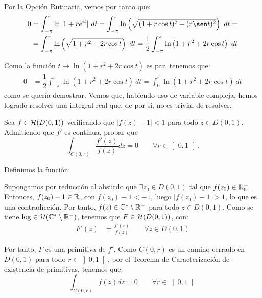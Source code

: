 \begin{ejercicio}
    Por la Opción Rutinaria, vemos por tanto que:
    \begin{align*}
        0&= \int_{-\pi}^{\pi} \ln|1+re^{it}|\ dt
        = \int_{-\pi}^{\pi} \ln\left(\sqrt{(1+r\cos t)^2+(r\sen t)^2}\right)\ dt
        =\\&= \int_{-\pi}^{\pi} \ln\left(\sqrt{1+r^2+2r\cos t}\right)\ dt
        = \dfrac{1}{2}\int_{-\pi}^{\pi} \ln\left(1+r^2+2r\cos t\right)\ dt
    \end{align*}

    Como la función $t\mapsto \ln\left(1+r^2+2r\cos t\right)$ es par, tenemos que:
    \begin{align*}
        0&= \dfrac{1}{2}\int_{-\pi}^{\pi} \ln\left(1+r^2+2r\cos t\right)\ dt
        = \int_{0}^{\pi} \ln\left(1+r^2+2r\cos t\right)\ dt
    \end{align*}
    como se quería demostrar. Vemos que, habiendo uso de variable compleja, hemos logrado resolver una integral real que, de por si, no es trivial de resolver.
\end{ejercicio}

\begin{ejercicio}
    Sea $f \in \mathcal{H}(D(0,1))$ verificando que $|f(z)-1| < 1$ para todo $z \in D(0,1)$. Admitiendo que $f'$ es continua, probar que
    \[
        \int_{C(0,r)} \frac{f'(z)}{f(z)}dz = 0\qquad \forall r \in \left]0,1\right[.
    \]

    Definimos la función:

    Supongamos por reducción al absurdo que $\exists z_0 \in D(0,1)$ tal que $f(z_0)\in \mathbb{R}_0^-$. Entonces, $f(z_0)-1\in \mathbb{R}$, con $f(z_0)-1<-1$, luego $|f(z_0)-1|>1$, lo que es una contradicción. Por tanto, $f(z)\in \mathbb{C}^\ast\setminus \mathbb{R}^-$ para todo $z \in D(0,1)$. Como se tiene $\log\in \mathcal{H}(\mathbb{C}^\ast\setminus \mathbb{R}^-)$, tenemos que $F\in \mathcal{H}(D(0,1))$, con:
    \begin{align*}
        F'(z) &= \frac{f'(z)}{f(z)}\qquad \forall z \in D(0,1)
    \end{align*}

    Por tanto, $F$ es una primitiva de $f'$. Como $C(0,r)$ es un camino cerrado en $D(0,1)$ para todo $r \in \left]0,1\right[$, por el Teorema de Caracterización de existencia de primitivas, tenemos que:
    \begin{equation*}
        \int_{C(0,r)} f(z)dz = 0\qquad \forall r \in \left]0,1\right[
    \end{equation*}
\end{ejercicio}


